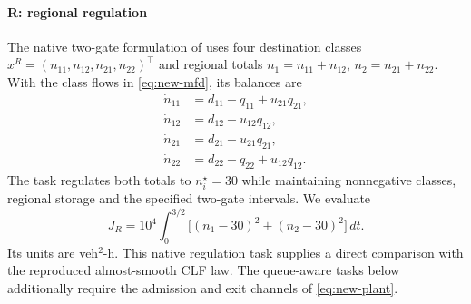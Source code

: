 \paragraph{R: regional regulation}
The native two-gate formulation of \cite{zhong2018robust} uses four
destination classes $x^R=(n_{11},n_{12},n_{21},n_{22})^\top$ and regional
totals $n_1=n_{11}+n_{12}$, $n_2=n_{21}+n_{22}$. With the class flows in
\eqref{eq:new-mfd}, its balances are
\begin{equation}
\begin{aligned}
\dot n_{11}&=d_{11}-q_{11}+u_{21}q_{21},\\
\dot n_{12}&=d_{12}-u_{12}q_{12},\\
\dot n_{21}&=d_{21}-u_{21}q_{21},\\
\dot n_{22}&=d_{22}-q_{22}+u_{12}q_{12}.
\end{aligned}
\label{eq:benchmark-native}
\end{equation}
The task regulates both totals to $n_i^\star=30$ while maintaining
nonnegative classes, regional storage and the specified two-gate intervals.
We evaluate
\begin{equation}
J_R=10^4\int_0^{3/2}\bigl[(n_1-30)^2+(n_2-30)^2\bigr]\,dt.
\label{eq:benchmark-regulation-cost}
\end{equation}
Its units are veh$^2$-h. This native regulation task supplies a direct
comparison with the reproduced almost-smooth CLF law. The queue-aware tasks
below additionally require the admission and exit channels of
\eqref{eq:new-plant}.

